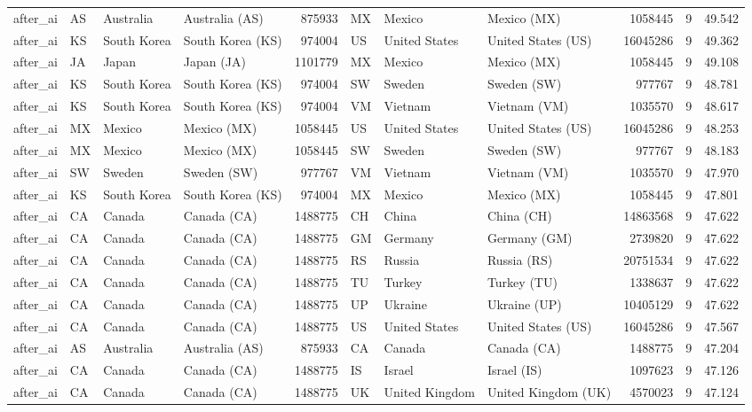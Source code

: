 \begin{tabular}{llllrlllrrr}
after\_ai & AS & Australia & Australia (AS) & 875933 & MX & Mexico & Mexico (MX) & 1058445 & 9 & 49.542 \\
after\_ai & KS & South Korea & South Korea (KS) & 974004 & US & United States & United States (US) & 16045286 & 9 & 49.362 \\
after\_ai & JA & Japan & Japan (JA) & 1101779 & MX & Mexico & Mexico (MX) & 1058445 & 9 & 49.108 \\
after\_ai & KS & South Korea & South Korea (KS) & 974004 & SW & Sweden & Sweden (SW) & 977767 & 9 & 48.781 \\
after\_ai & KS & South Korea & South Korea (KS) & 974004 & VM & Vietnam & Vietnam (VM) & 1035570 & 9 & 48.617 \\
after\_ai & MX & Mexico & Mexico (MX) & 1058445 & US & United States & United States (US) & 16045286 & 9 & 48.253 \\
after\_ai & MX & Mexico & Mexico (MX) & 1058445 & SW & Sweden & Sweden (SW) & 977767 & 9 & 48.183 \\
after\_ai & SW & Sweden & Sweden (SW) & 977767 & VM & Vietnam & Vietnam (VM) & 1035570 & 9 & 47.970 \\
after\_ai & KS & South Korea & South Korea (KS) & 974004 & MX & Mexico & Mexico (MX) & 1058445 & 9 & 47.801 \\
after\_ai & CA & Canada & Canada (CA) & 1488775 & CH & China & China (CH) & 14863568 & 9 & 47.622 \\
after\_ai & CA & Canada & Canada (CA) & 1488775 & GM & Germany & Germany (GM) & 2739820 & 9 & 47.622 \\
after\_ai & CA & Canada & Canada (CA) & 1488775 & RS & Russia & Russia (RS) & 20751534 & 9 & 47.622 \\
after\_ai & CA & Canada & Canada (CA) & 1488775 & TU & Turkey & Turkey (TU) & 1338637 & 9 & 47.622 \\
after\_ai & CA & Canada & Canada (CA) & 1488775 & UP & Ukraine & Ukraine (UP) & 10405129 & 9 & 47.622 \\
after\_ai & CA & Canada & Canada (CA) & 1488775 & US & United States & United States (US) & 16045286 & 9 & 47.567 \\
after\_ai & AS & Australia & Australia (AS) & 875933 & CA & Canada & Canada (CA) & 1488775 & 9 & 47.204 \\
after\_ai & CA & Canada & Canada (CA) & 1488775 & IS & Israel & Israel (IS) & 1097623 & 9 & 47.126 \\
after\_ai & CA & Canada & Canada (CA) & 1488775 & UK & United Kingdom & United Kingdom (UK) & 4570023 & 9 & 47.124 \\

\end{tabular}
